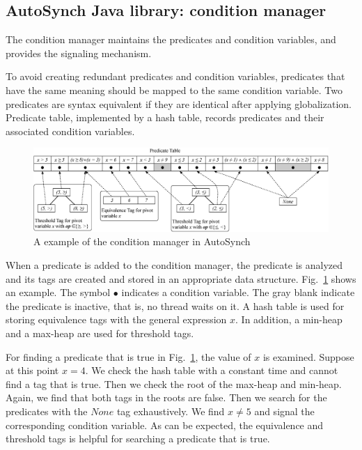 \documentclass[preprint]{sigplanconf}
\newtheorem{definition}{Definition}
\begin{document}
\subsection{AutoSynch Java library: condition manager}
The condition manager maintains the predicates and condition variables, and
provides the signaling mechanism. 

To avoid creating redundant predicates and condition variables, predicates that have 
the same meaning should be mapped to the same condition variable. Two 
predicates are syntax equivalent if they 
are identical after applying globalization. Predicate table, implemented by a
hash table, records predicates and their associated condition variables. 

\begin{figure}[ht!]
  \centering
  \includegraphics[width=180mm]{fig/manager.eps}
  \caption{A example of the condition manager in AutoSynch}
  \label{fig:mgr}
\end{figure}


When a predicate is added to the condition manager, the predicate is analyzed
and its tags are created and stored in an appropriate data structure. 
Fig.~\ref{fig:mgr} shows an example. The symbol $\bullet$ indicates 
a condition variable. The gray blank indicate the predicate is inactive,
that is, no thread waits on it. A hash table is used for
storing equivalence tags with the general expression $x$. In addition, 
a min-heap and a max-heap are used for threshold tags. 



For finding a predicate that is true in Fig.~\ref{fig:mgr}, the value of $x$ is 
examined. Suppose at this point $x=4$. We check the hash table with a
constant time and cannot find a tag that is true. Then we check the root of 
the max-heap and min-heap. Again, we find that both tags in the roots are
false. Then we search for the predicates with the $None$ tag exhaustively. We 
find $x \ne 5$ and signal the corresponding condition variable. As can
be expected, the equivalence and threshold tags is helpful for searching a 
predicate that is true.   
\end{document}
